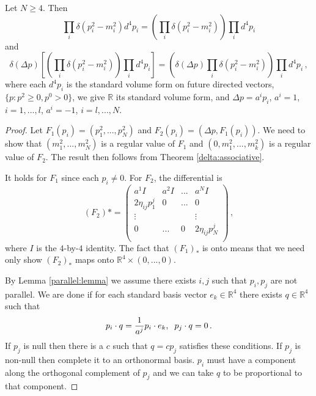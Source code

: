 \begin{lemma}
Let $N\geq 4$. Then
\begin{equation}
\prod_i \delta(p_i^2-m_i^2)d^4p_i=\left(\prod_i \delta(p_i^2-m_i^2)\right)\prod_i d^4p_i
\end{equation}
 and 
\begin{equation}
\delta(\Delta p)\left[\left(\prod_i \delta(p_i^2-m_i^2)\right)\prod_i d^4p_i\right]=\left(\delta(\Delta p)\prod_i \delta(p_i^2-m_i^2)\right)\prod_i d^4p_i\,,
\end{equation}
where each $d^4p_i$ is the standard volume form on future directed vectors, $\{p:p^2\geq 0, p^0>0\}$, we give $\mathbb{R}$ its standard volume form, and $\Delta p=a^ip_i$, $a^i=1$, $i=1,...,l$, $a^i=-1$, $i=l,...,N$. 
\end{lemma}
\begin{proof}
Let $F_1(p_i)=(p_1^2,...,p_N^2)$ and $F_2(p_i)=(\Delta p,F_1(p_i))$. We need to show that $(m_1^2,...,m_N^2)$ is a regular value of $F_1$ and $(0,m_1^2,...,m_k^2)$ is a regular value of $F_2$. The result then follows from Theorem \ref{delta:associative}.

It holds for $F_1$ since each $p_i\neq 0$. For $F_2$, the differential is
\begin{equation}
(F_2)*=\left( \begin{array}{cccc}
a^{1}I&a^{2}I&...& a^{N}I \\
2 \eta_{ij}p^j_1&0&...&0\\
\vdots&&&\vdots\\
0&...&0&2 \eta_{ij}p^j_N\\
\end{array} \right)\,,
\end{equation}
where $I$ is the $4$-by-$4$ identity. The fact that $(F_1)_*$ is onto means that we need only show $(F_2)_*$ maps onto $\mathbb{R}^4\times(0,...,0)$. 

By Lemma \ref{parallel:lemma} we assume there exists $i,j$ such that $p_i,p_j$ are not parallel. We are done if for each standard basis vector $e_k\in\mathbb{R}^4$ there exists $q\in\mathbb{R}^4$ such that
\begin{equation}
p_i\cdot q=\frac{1}{a^j}p_i\cdot e_k,\hspace{2mm} p_j\cdot q=0\,.
\end{equation}
If $p_j$ is null then there is a $c$ such that $q=c p_j$ satisfies these conditions. If $p_j$ is non-null then complete it to an orthonormal basis. $p_i$ must have a component along the orthogonal complement of $p_j$ and we can take $q$ to be proportional to that component.

\end{proof}


